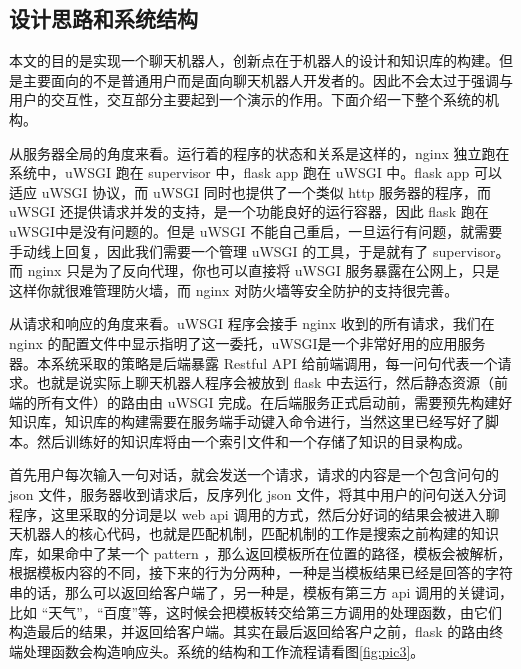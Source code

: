 \documentclass[bachelor,winfonts]{jnuthesis}
\begin{document}
\subsection{设计思路和系统结构}

本文的目的是实现一个聊天机器人，创新点在于机器人的设计和知识库的构建。但是主要面向的不是普通用户而是面向聊天机器人开发者的。因此不会太过于强调与用户的交互性，交互部分主要起到一个演示的作用。下面介绍一下整个系统的机构。

从服务器全局的角度来看。运行着的程序的状态和关系是这样的，nginx 独立跑在系统中，uWSGI 跑在 supervisor 中，flask app 跑在 uWSGI 中。flask app 可以适应 uWSGI 协议，而 uWSGI 同时也提供了一个类似 http 服务器的程序，而 uWSGI 还提供请求并发的支持，是一个功能良好的运行容器，因此 flask 跑在 uWSGI中是没有问题的。但是 uWSGI 不能自己重启，一旦运行有问题，就需要手动线上回复，因此我们需要一个管理 uWSGI 的工具，于是就有了 supervisor。而 nginx 只是为了反向代理，你也可以直接将 uWSGI 服务暴露在公网上，只是这样你就很难管理防火墙，而 nginx 对防火墙等安全防护的支持很完善。

从请求和响应的角度来看。uWSGI 程序会接手 nginx 收到的所有请求，我们在 nginx 的配置文件中显示指明了这一委托，uWSGI是一个非常好用的应用服务器。本系统采取的策略是后端暴露 Restful API 给前端调用，每一问句代表一个请求。也就是说实际上聊天机器人程序会被放到 flask 中去运行，然后静态资源（前端的所有文件）的路由由 uWSGI 完成。在后端服务正式启动前，需要预先构建好知识库，知识库的构建需要在服务端手动键入命令进行，当然这里已经写好了脚本。然后训练好的知识库将由一个索引文件和一个存储了知识的目录构成。

首先用户每次输入一句对话，就会发送一个请求，请求的内容是一个包含问句的 json 文件，服务器收到请求后，反序列化 json 文件，将其中用户的问句送入分词程序，这里采取的分词是以 web api 调用的方式，然后分好词的结果会被进入聊天机器人的核心代码，也就是匹配机制，匹配机制的工作是搜索之前构建的知识库，如果命中了某一个 pattern ，那么返回模板所在位置的路径，模板会被解析，根据模板内容的不同，接下来的行为分两种，一种是当模板结果已经是回答的字符串的话，那么可以返回给客户端了，另一种是，模板有第三方 api 调用的关键词，比如 “天气”，“百度”等，这时候会把模板转交给第三方调用的处理函数，由它们构造最后的结果，并返回给客户端。其实在最后返回给客户之前，flask 的路由终端处理函数会构造响应头。系统的结构和工作流程请看图\ref{fig:pic3}。
\end{document}
